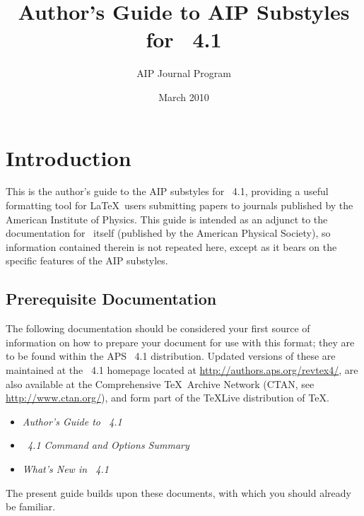 \documentclass[%
 reprint,%
 amssymb, amsmath,%
 aip,cha,%
]{revtex4-1}
\begin{document}
\title{Author's Guide to AIP Substyles for \revtex~4.1}%

\author{AIP Journal Program}%
%

\date{March 2010}%
\revised{\today}%

\maketitle

\tableofcontents

\section{Introduction}

This is the author's guide to the AIP substyles for \revtex~4.1, 
providing a useful formatting tool 
for \LaTeX\ users submitting papers to journals 
published by the American Institute of Physics.
This guide is intended as an adjunct to the documentation for \revtex\ itself 
(published by the American Physical Society), 
so information contained therein is not repeated here, 
except as it bears on the specific features of the AIP substyles.


\subsection{Prerequisite Documentation}

The following documentation should be considered your first source of information 
on how to prepare your document for use with this format; 
they are to be found within the APS \revtex~4.1 distribution. 
Updated versions of these are maintained at
the \revtex~4.1 homepage located at \url{http://authors.aps.org/revtex4/},
are also available at the Comprehensive \TeX\ Archive Network (CTAN, see \url{http://www.ctan.org/}), 
and form part of the \TeX Live distribution of \TeX.
\begin{itemize}
\item \textit{Author's Guide to \revtex~4.1}
\item \textit{\revtex~4.1 Command and Options Summary}
\item \textit{What's New in \revtex~4.1}
\end{itemize}
The present guide builds upon these documents, with which you should already be familiar.
\end{document}
